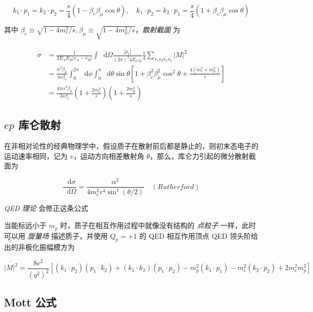 \documentclass[oneside,a4paper,openany,11pt]{ctexbook}
\newcommand*{\dif}{\mathop{}\!\mathrm{d}} %
\begin{document}
\begin{equation}
    k_1 \cdot p_1 = k_2 \cdot p_2 = \frac{s}{4} (1 - \beta_e \beta_\mu \cos\theta), \quad k_1 \cdot p_2 = k_2 \cdot p_1 = \frac{s}{4} (1 + \beta_e \beta_\mu \cos\theta)
\end{equation}

其中 $\beta_e \equiv \sqrt{1-4 m_e^2/s}, \beta_\mu \equiv \sqrt{1-4 m_\mu^2/s}$，\emph{散射截面} 为

\begin{align}
    \sigma &= \frac{1}{2 E_A E_B |v_A - v_B|} \int \dif\Omega \frac{|p_1|}{(2\pi)^2 4 E_{CM}} \frac{1}{4} \sum_{s_1 s_2 s_1^\prime s_2^\prime} |M|^2 \\
    &= \frac{\alpha^2 \beta_\mu}{4s\beta_e} \int_0^{2\pi} \dif\phi \int_0^{\pi} \dif\theta \sin\theta \left[1+\beta_e^2 \beta_\mu^2 \cos^2 \theta + \frac{4(m^2_e+m^2_\mu)}{s}\right] \\
    &= \frac{4\pi \alpha^2 \beta_\mu}{3s\beta_e} \left(1+\frac{2 m^2_e}{s}\right) \left(1+\frac{2 m^2_\mu}{s}\right)
\end{align}

\subsection{\texorpdfstring{$ep$}{ep} 库仑散射}

在非相对论性的经典物理学中，假设质子在散射前后都是静止的，则初末态电子的运动速率相同，记为 $v$，运动方向相差散射角 $\theta$，那么，库仑力引起的微分散射截面为

\begin{equation}
    \frac{\dif\sigma}{\dif\Omega} = \frac{\alpha^2}{4 m_e^2 v^4 \sin^4(\theta/2)} \quad (Rutherford)
\end{equation}

\emph{QED 理论} 会修正这条公式

当能标远小于 $m_p$ 时，质子在相互作用过程中就像没有结构的 \emph{点粒子} 一样，此时可以用 \emph{旋量场} 描述质子，并使用 $Q_p=+1$ 的 QED 相互作用顶点 QED 领头阶给出的非极化振幅模方为

\begin{equation}
    \overline{|M|^2} = \frac{8 e^2}{(q^2)^2} \left[(k_1 \cdot p_2) (p_1 \cdot k_2) + (k_1 \cdot k_2) (p_1 \cdot p_2) - m_p^2 (k_1 \cdot p_1) - m_e^2 (k_2 \cdot p_2) + 2 m_e^2 m_p^2\right]
\end{equation}

\subsection{Mott 公式}
\end{document}
